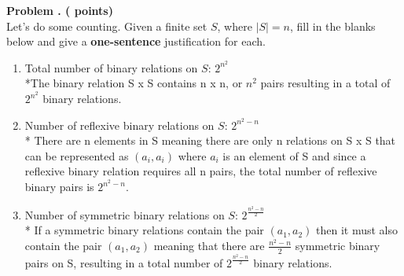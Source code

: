 
\newpage
\addtocounter{problemctr}{1}

{\bf
Problem \theproblemctr.  (\therelation\xspace points)}
\\

Let's do some counting. Given a finite set $S$, where $\lvert S \rvert= n$, fill in the blanks below and give a {\bf one-sentence} justification for each.

\vspace{.2in}

\begin{enumerate}[label=(\arabic*),itemsep=2in]
\item
Total number of binary relations on $S$:
\underline{\hspace{27mm} $2^{n^{2}}$ \hspace{27mm}}
\bigskip
\\*The binary relation S x S contains n x n, or $n^2$ pairs resulting in a total of $2^{n^{2}}$ binary relations.
\item
Number of reflexive binary relations on $S$:
\underline{{\hspace{26mm} $2^{n^{2} - n}$ \hspace{26mm}}}
\bigskip
\\* There are n elements in S meaning there are only n relations on S x S that can be represented as $(a_i, a_i)$ where $a_i$ is an element of S and since a reflexive binary relation requires all n pairs, the total number of reflexive binary pairs is $2^{n^2-n}.$
\item
Number of symmetric binary relations on $S$:
\underline{{\hspace{26mm} $2^{\frac{n^{2} - n}{2}}$ \hspace{26mm}}}
\bigskip
\\* If a symmetric binary relations contain the pair $(a_1, a_2)$ then it must also contain the pair $(a_1, a_2)$ meaning that there are $\frac{n^2 - n}{2}$ symmetric binary pairs on S, resulting in a total number of $2^{\frac{n^{2} - n}{2}}$ binary relations.
\end{enumerate}

\newpage
